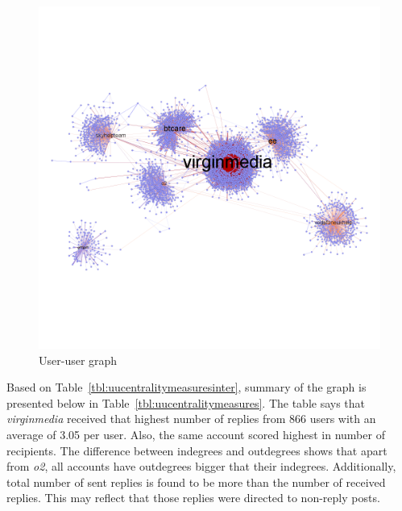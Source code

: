 \documentclass[sigconf]{acmart}
\begin{document}
\begin{figure}[htb]
\centering
\includegraphics[width=\columnwidth]{images/userusergraph.png}
\caption{User-user graph}
\label{fig:userusergraph}
\end{figure}

Based on Table~\ref{tbl:uucentralitymeasuresinter}, summary of the
graph is presented below in Table~\ref{tbl:uucentralitymeasures}. The
table says that {\emph{virginmedia}} received that highest number of
replies from 866 users with an average of 3.05 per user. Also, the
same account scored highest in number of recipients. The difference
between indegrees and outdegrees shows that apart from {\emph{o2}},
all accounts have outdegrees bigger that their
indegrees. Additionally, total number of sent replies is found to be
more than the number of received replies. This may reflect that those
replies were directed to non-reply posts.
\end{document}
